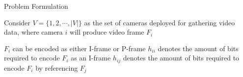 \begin{frame}{Problem Formulation}
\begin{itemize}
	\myItem Consider $V=\{1,2,\cdots,|V|\}$ as the set of cameras deployed for gathering video data, where camera $i$ will produce video frame $F_i$
	\begin{itemize}
		\mySubItem $F_i$ can be encoded as either I-frame or P-frame
		\mySubItem $h_{ii}$ denotes the amount of bits required to encode $F_i$ as an I-frame
		\mySubItem $h_{ij}$ denotes the amount of bits required to encode $F_i$ by referencing $F_j$
	\end{itemize}	 
\end{itemize}
\end{frame}